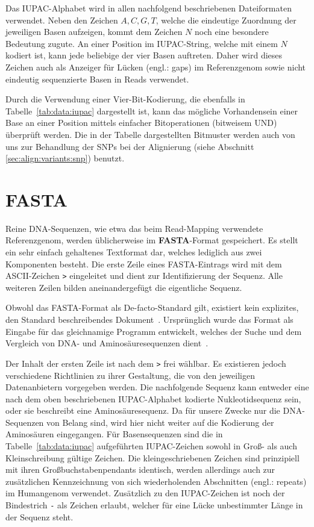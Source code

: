 Das IUPAC-Alphabet wird in allen nachfolgend beschriebenen Dateiformaten verwendet.
Neben den Zeichen $A, C, G, T$, welche die eindeutige Zuordnung der jeweiligen Basen aufzeigen, kommt dem Zeichen $N$ noch eine besondere Bedeutung zugute.
An einer Position im IUPAC-String, welche mit einem $N$ kodiert ist, kann jede beliebige der vier Basen auftreten.
Daher wird dieses Zeichen auch als Anzeiger für Lücken (engl.: gaps) im Referenzgenom sowie nicht eindeutig sequenzierte Basen in Reads verwendet.

Durch die Verwendung einer Vier-Bit-Kodierung, die ebenfalls in Tabelle~\ref{tab:data:iupac} dargestellt ist, kann das mögliche Vorhandensein einer Base an einer Position mittels einfacher Bitoperationen (bitweisem UND) überprüft werden.
Die in der Tabelle dargestellten Bitmuster werden auch von uns zur Behandlung der SNPs bei der Alignierung (siehe Abschnitt \ref{sec:align:variants:snp}) benutzt.

\section{FASTA}
\label{sec:data:fasta}
Reine DNA-Sequenzen, wie etwa das beim Read-Mapping verwendete Referenzgenom, werden üblicherweise im \textbf{FASTA}-Format gespeichert.
Es stellt ein sehr einfach gehaltenes Textformat dar, welches lediglich aus zwei Komponenten besteht.
Die erste Zeile eines FASTA-Eintrags wird mit dem ASCII-Zeichen \texttt{>} eingeleitet und dient zur Identifizierung der Sequenz.
Alle weiteren Zeilen bilden aneinandergefügt die eigentliche Sequenz.

Obwohl das FASTA-Format als De-facto-Standard gilt, existiert kein explizites, den Standard beschreibendes Dokument~\citep{Cock2010}.
Ursprünglich wurde das Format als Eingabe für das gleichnamige Programm entwickelt, welches der Suche und dem Vergleich von DNA- und Aminosäuresequenzen dient~\citep{Pearson1988}.

Der Inhalt der ersten Zeile ist nach dem \texttt{>} frei wählbar.
Es existieren jedoch verschiedene Richtlinien zu ihrer Gestaltung, die von den jeweiligen Datenanbietern vorgegeben werden.
Die nachfolgende Sequenz kann entweder eine nach dem oben beschriebenen IUPAC-Alphabet kodierte Nukleotidsequenz sein, oder sie beschreibt eine Aminosäuresequenz.
Da für unsere Zwecke nur die DNA-Sequenzen von Belang sind, wird hier nicht weiter auf die Kodierung der Aminosäuren eingegangen.
Für Basensequenzen sind die in Tabelle~\ref{tab:data:iupac} aufgeführten IUPAC-Zeichen sowohl in Groß- als auch Kleinschreibung gültige Zeichen.
Die kleingeschriebenen Zeichen sind prinzipiell mit ihren Großbuchstabenpendants identisch, werden allerdings auch zur zusätzlichen Kennzeichnung von sich wiederholenden Abschnitten (engl.: repeats) im Humangenom verwendet.
Zusätzlich zu den IUPAC-Zeichen ist noch der Bindestrich \texttt{-} als Zeichen erlaubt, welcher für eine Lücke unbestimmter Länge in der Sequenz steht.

